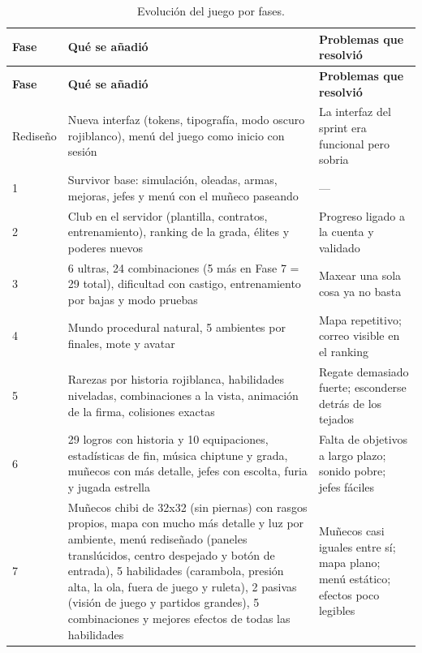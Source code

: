 \begin{longtable}{@{}L{1.2cm} L{5.6cm} L{5.2cm}@{}}
\caption{Evolución del juego por fases.}\label{tab:juego-fases}\\
\toprule
\textbf{Fase} & \textbf{Qué se añadió} & \textbf{Problemas que resolvió} \\ \midrule \endfirsthead
\toprule
\textbf{Fase} & \textbf{Qué se añadió} & \textbf{Problemas que resolvió} \\ \midrule \endhead
Rediseño & Nueva interfaz (tokens, tipografía, modo oscuro rojiblanco), menú del juego como inicio con sesión & La interfaz del sprint era funcional pero sobria \\
1 & Survivor base: simulación, oleadas, armas, mejoras, jefes y menú con el muñeco paseando & — \\
2 & Club en el servidor (plantilla, contratos, entrenamiento), ranking de la grada, élites y poderes nuevos & Progreso ligado a la cuenta y validado \\
3 & 6 ultras, 24 combinaciones (5 más en Fase 7 = 29 total), dificultad con castigo, entrenamiento por bajas y modo pruebas & Maxear una sola cosa ya no basta \\
4 & Mundo procedural natural, 5 ambientes por finales, mote y avatar & Mapa repetitivo; correo visible en el ranking \\
5 & Rarezas por historia rojiblanca, habilidades niveladas, combinaciones a la vista, animación de la firma, colisiones exactas & Regate demasiado fuerte; esconderse detrás de los tejados \\
6 & 29 logros con historia y 10 equipaciones, estadísticas de fin, música chiptune y grada, muñecos con más detalle, jefes con escolta, furia y jugada estrella & Falta de objetivos a largo plazo; sonido pobre; jefes fáciles \\
7 & Muñecos chibi de 32x32 (sin piernas) con rasgos propios, mapa con mucho más detalle y luz por ambiente, menú rediseñado (paneles translúcidos, centro despejado y botón de entrada), 5 habilidades (carambola, presión alta, la ola, fuera de juego y ruleta), 2 pasivas (visión de juego y partidos grandes), 5 combinaciones y mejores efectos de todas las habilidades & Muñecos casi iguales entre sí; mapa plano; menú estático; efectos poco legibles \\*
\bottomrule
\end{longtable}
